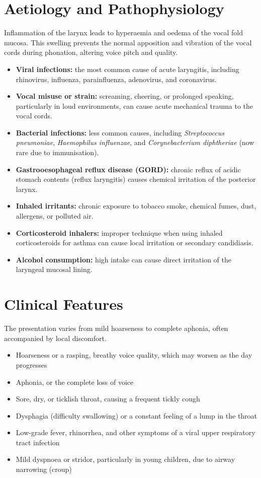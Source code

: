 \section*{Aetiology and Pathophysiology}
Inflammation of the larynx leads to hyperaemia and oedema of the vocal fold mucosa. This swelling prevents the normal apposition and vibration of the vocal cords during phonation, altering voice pitch and quality.
\begin{itemize}
    \item \textbf{Viral infections:} the most common cause of acute laryngitis, including rhinovirus, influenza, parainfluenza, adenovirus, and coronavirus.
    \item \textbf{Vocal misuse or strain:} screaming, cheering, or prolonged speaking, particularly in loud environments, can cause acute mechanical trauma to the vocal cords.
    \item \textbf{Bacterial infections:} less common causes, including \textit{Streptococcus pneumoniae}, \textit{Haemophilus influenzae}, and \textit{Corynebacterium diphtheriae} (now rare due to immunisation).
    \item \textbf{Gastrooesophageal reflux disease (GORD):} chronic reflux of acidic stomach contents (reflux laryngitis) causes chemical irritation of the posterior larynx.
    \item \textbf{Inhaled irritants:} chronic exposure to tobacco smoke, chemical fumes, dust, allergens, or polluted air.
    \item \textbf{Corticosteroid inhalers:} improper technique when using inhaled corticosteroids for asthma can cause local irritation or secondary candidiasis.
    \item \textbf{Alcohol consumption:} high intake can cause direct irritation of the laryngeal mucosal lining.
\end{itemize}

\section*{Clinical Features}
The presentation varies from mild hoarseness to complete aphonia, often accompanied by local discomfort.
\begin{itemize}
    \item Hoarseness or a rasping, breathy voice quality, which may worsen as the day progresses
    \item Aphonia, or the complete loss of voice
    \item Sore, dry, or ticklish throat, causing a frequent tickly cough
    \item Dysphagia (difficulty swallowing) or a constant feeling of a lump in the throat
    \item Low-grade fever, rhinorrhea, and other symptoms of a viral upper respiratory tract infection
    \item Mild dyspnoea or stridor, particularly in young children, due to airway narrowing (croup)
\end{itemize}

